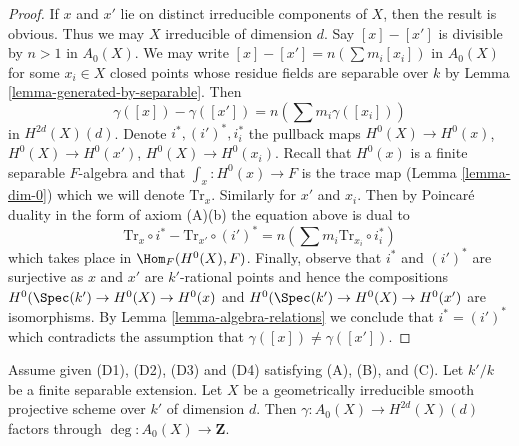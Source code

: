 \begin{proof}
If $x$ and $x'$ lie on distinct irreducible components of $X$, then
the result is obvious. Thus we may $X$ irreducible of dimension $d$.
Say $[x] - [x']$ is divisible by $n > 1$ in $A_0(X)$.
We may write $[x] - [x'] = n(\sum m_i [x_i])$ in $A_0(X)$
for some $x_i \in X$ closed points
whose residue fields are separable over $k$ by
Lemma \ref{lemma-generated-by-separable}.
Then
$$
\gamma([x]) - \gamma([x']) = n (\sum m_i \gamma([x_i]))
$$
in $H^{2d}(X)(d)$. Denote $i^*, (i')^*, i_i^*$ the pullback maps
$H^0(X) \to H^0(x)$, $H^0(X) \to H^0(x')$, $H^0(X) \to H^0(x_i)$.
Recall that $H^0(x)$ is a finite separable $F$-algebra
and that $\int_x : H^0(x) \to F$ is the trace map
(Lemma \ref{lemma-dim-0}) which we will denote $\text{Tr}_x$.
Similarly for $x'$ and $x_i$. Then by Poincar\'e duality in the form of
axiom (A)(b) the equation above is dual to
$$
\text{Tr}_x \circ i^* - \text{Tr}_{x'} \circ (i')^* =
n(\sum m_i \text{Tr}_{x_i} \circ i_i^*)
$$
which takes place in $\Hom_F(H^0(X), F)$. Finally, observe that
$i^*$ and $(i')^*$ are surjective as $x$ and $x'$ are $k'$-rational
points and hence the compositions $H^0(\Spec(k') \to H^0(X) \to H^0(x)$
and $H^0(\Spec(k') \to H^0(X) \to H^0(x')$ are isomorphisms.
By Lemma \ref{lemma-algebra-relations} we conclude that $i^* = (i')^*$
which contradicts the assumption that $\gamma([x]) \not = \gamma([x'])$.
\end{proof}

\begin{lemma}
\label{lemma-classes-points}
Assume given (D1), (D2), (D3) and (D4) satisfying (A), (B), and (C).
Let $k'/k$ be a finite separable extension. Let $X$ be a geometrically
irreducible smooth projective scheme over $k'$ of dimension $d$.
Then $\gamma : A_0(X) \to H^{2d}(X)(d)$ factors through
$\deg : A_0(X) \to \mathbf{Z}$.
\end{lemma}

